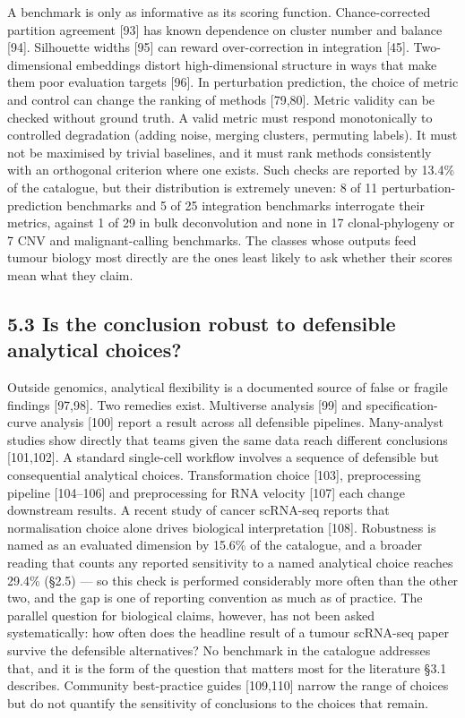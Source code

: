 \documentclass{article}
\begin{document}
A benchmark is only as informative as its scoring function.
Chance-corrected partition agreement {[}93{]} has known dependence on
cluster number and balance {[}94{]}. Silhouette widths {[}95{]} can
reward over-correction in integration {[}45{]}. Two-dimensional
embeddings distort high-dimensional structure in ways that make them
poor evaluation targets {[}96{]}. In perturbation prediction, the choice
of metric and control can change the ranking of methods {[}79,80{]}.
Metric validity can be checked without ground truth. A valid metric must
respond monotonically to controlled degradation (adding noise, merging
clusters, permuting labels). It must not be maximised by trivial
baselines, and it must rank methods consistently with an orthogonal
criterion where one exists. Such checks are reported by 13.4\% of the
catalogue, but their distribution is extremely uneven: 8 of 11
perturbation-prediction benchmarks and 5 of 25 integration benchmarks
interrogate their metrics, against 1 of 29 in bulk deconvolution and
none in 17 clonal-phylogeny or 7 CNV and malignant-calling benchmarks.
The classes whose outputs feed tumour biology most directly are the ones
least likely to ask whether their scores mean what they claim.

\subsection{5.3 Is the conclusion robust to defensible analytical choices?}\label{is-the-conclusion-robust-to-defensible-analytical-choices}

Outside genomics, analytical flexibility is a documented source of false
or fragile findings {[}97,98{]}. Two remedies exist. Multiverse analysis
{[}99{]} and specification-curve analysis {[}100{]} report a result
across all defensible pipelines. Many-analyst studies show directly that
teams given the same data reach different conclusions {[}101,102{]}. A
standard single-cell workflow involves a sequence of defensible but
consequential analytical choices. Transformation choice {[}103{]},
preprocessing pipeline {[}104--106{]} and preprocessing for RNA velocity
{[}107{]} each change downstream results. A recent study of cancer
scRNA-seq reports that normalisation choice alone drives biological
interpretation {[}108{]}. Robustness is named as an evaluated dimension
by 15.6\% of the catalogue, and a broader reading that counts any
reported sensitivity to a named analytical choice reaches 29.4\% (§2.5)
--- so this check is performed considerably more often than the other
two, and the gap is one of reporting convention as much as of practice.
The parallel question for biological claims, however, has not been asked
systematically: how often does the headline result of a tumour scRNA-seq
paper survive the defensible alternatives? No benchmark in the catalogue
addresses that, and it is the form of the question that matters most for
the literature §3.1 describes. Community best-practice guides
{[}109,110{]} narrow the range of choices but do not quantify the
sensitivity of conclusions to the choices that remain.
\end{document}
